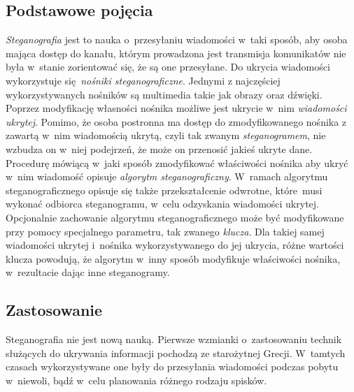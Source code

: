 \documentclass[a4paper, twoside, 12pt]{report}
\begin{document}
        \subsection{Podstawowe pojęcia} \label{STEGANOGRAFIAPOJECIA}
        \emph{Steganografia} jest to nauka o~przesyłaniu wiadomości w~taki sposób, aby
        osoba mająca dostęp do kanału, którym prowadzona jest transmisja komunikatów
        nie była w~stanie zorientować się, że są one przesyłane.
        Do ukrycia wiadomości wykorzystuje się \emph{nośniki steganograficzne}\cite{STEGANOGRAFIASIECIOWAART}.
        Jednymi z najczęściej wykorzystywanych nośników są multimedia takie jak
        obrazy oraz dźwięki. Poprzez modyfikację własności nośnika możliwe jest
        ukrycie w~nim \emph{wiadomości ukrytej}. Pomimo, że osoba postronna ma
        dostęp do zmodyfikowanego nośnika z zawartą w~nim wiadomością ukrytą,
        czyli tak zwanym \emph{steganogramem}, nie wzbudza on w~niej podejrzeń,
        że może on przenosić jakieś ukryte dane. Procedurę mówiącą w~jaki sposób
        zmodyfikować właściwości nośnika aby ukryć w~nim wiadomość opisuje
        \emph{algorytm steganograficzny}. W~ramach algorytmu steganograficznego
        opisuje się także przekształcenie odwrotne, które musi
        wykonać odbiorca steganogramu, w~celu odzyskania wiadomości ukrytej.
        Opcjonalnie zachowanie algorytmu steganograficznego może być modyfikowane przy pomocy specjalnego
        parametru, tak zwanego \emph{klucza}.  Dla takiej samej wiadomości ukrytej i~nośnika
        wykorzystywanego do jej ukrycia, różne wartości klucza powodują, że algorytm
        w~inny sposób modyfikuje właściwości nośnika, w~rezultacie dając inne
        steganogramy.

        \subsection{Zastosowanie}
        Steganografia nie jest nową nauką. Pierwsze wzmianki o~zastosowaniu technik
        służących do ukrywania informacji pochodzą ze starożytnej Grecji\cite{STEGANOGRAPHYINTRO}.
        W~tamtych czasach wykorzystywane one były do przesyłania wiadomości
        podczas pobytu w~niewoli, bądź w~celu planowania różnego rodzaju spisków.
\end{document}
